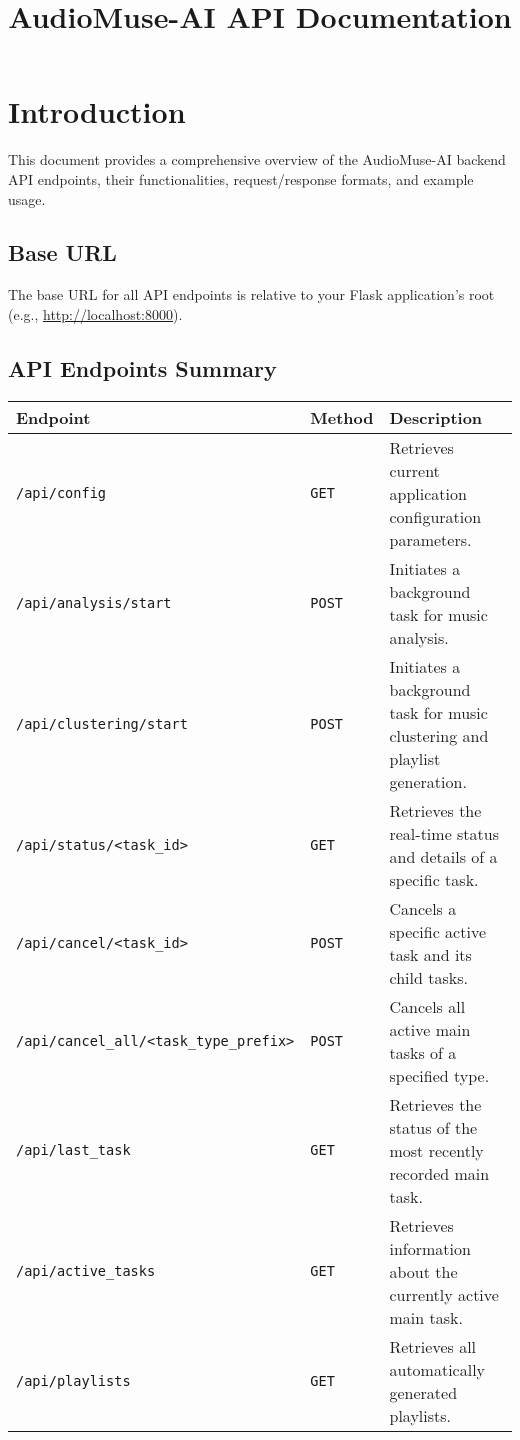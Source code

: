 \documentclass{article}
\title{AudioMuse-AI API Documentation}
\author{}
\date{}
\begin{document}
\maketitle
\tableofcontents
\newpage

\section{Introduction}
This document provides a comprehensive overview of the AudioMuse-AI backend API endpoints, their functionalities, request/response formats, and example usage.

\subsection*{Base URL}
The base URL for all API endpoints is relative to your Flask application's root (e.g., \url{http://localhost:8000}).

\subsection*{API Endpoints Summary}
\begin{tabular}{|l|l|l|}
\hline
\textbf{Endpoint} & \textbf{Method} & \textbf{Description} \\
\hline
\verb|/api/config| & \texttt{GET} & Retrieves current application configuration parameters. \\
\hline
\verb|/api/analysis/start| & \texttt{POST} & Initiates a background task for music analysis. \\
\hline
\verb|/api/clustering/start| & \texttt{POST} & Initiates a background task for music clustering and playlist generation. \\
\hline
\verb|/api/status/<task_id>| & \texttt{GET} & Retrieves the real-time status and details of a specific task. \\
\hline
\verb|/api/cancel/<task_id>| & \texttt{POST} & Cancels a specific active task and its child tasks. \\
\hline
\verb|/api/cancel_all/<task_type_prefix>| & \texttt{POST} & Cancels all active main tasks of a specified type. \\
\hline
\verb|/api/last_task| & \texttt{GET} & Retrieves the status of the most recently recorded main task. \\
\hline
\verb|/api/active_tasks| & \texttt{GET} & Retrieves information about the currently active main task. \\
\hline
\verb|/api/playlists| & \texttt{GET} & Retrieves all automatically generated playlists. \\
\hline
\end{tabular}
\end{document}
